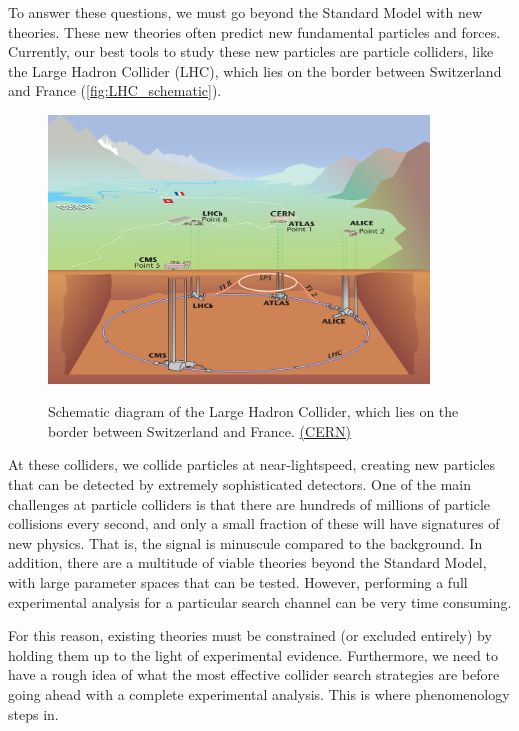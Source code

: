 To answer these questions, we must go beyond the Standard Model with new theories. These new theories often predict new fundamental particles and forces. Currently, our best tools to study these new particles are particle colliders, like the Large Hadron Collider (LHC), which lies on the border between Switzerland and France (\autoref{fig:LHC_schematic}).

\begin{figure}
  \centering
  \includegraphics[width=0.9\textwidth]{images/LHC}
  \label{fig:LHC_schematic}
  \caption{Schematic diagram of the Large Hadron Collider, which lies on the border between Switzerland and France. \href{http://cds.cern.ch/journal/CERNBulletin/2008/38/News\%20Articles/1125888?ln=en}{(CERN)}}
\end{figure}

At these colliders, we collide particles at near-lightspeed, creating new particles that can be detected by extremely sophisticated detectors. One of the main challenges at particle colliders is that there are hundreds of millions of particle collisions every second, and only a small fraction of these will have signatures of new physics. That is, the signal is minuscule compared to the background. In addition, there are a multitude of viable theories beyond the Standard Model, with large parameter spaces that can be tested. However, performing a full experimental analysis for a particular search channel can be very time consuming.

For this reason, existing theories must be constrained (or excluded entirely) by holding them up to the light of experimental evidence. Furthermore, we need to have a rough idea of what the most effective collider search strategies are before going ahead with a complete experimental analysis. This is where phenomenology steps in.

